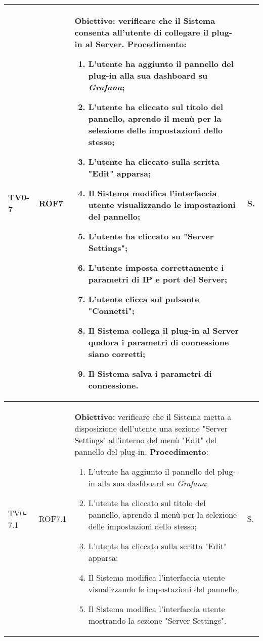 \begin{longtable}{|C{.15\textwidth}|C{.13\textwidth}|m{.65\textwidth}|C{.08\textwidth}|}
TV0-7 & ROF7 &
	\textbf{Obiettivo}: verificare che il Sistema consenta all'utente di collegare il plug-in al Server. \newline
	\textbf{Procedimento}:
	\begin{enumerate}
		\item L'utente ha aggiunto il pannello del plug-in alla sua dashboard su \textit{Grafana};
		\item L'utente ha cliccato sul titolo del pannello, aprendo il menù per la selezione delle impostazioni dello stesso;
		\item L'utente ha cliccato sulla scritta "Edit" apparsa;
		\item Il Sistema modifica l'interfaccia utente visualizzando le impostazioni del pannello;
		\item L'utente ha cliccato su "Server Settings";
		\item L'utente imposta correttamente i parametri di IP e port del Server;
		\item L'utente clicca sul pulsante "Connetti";
		\item Il Sistema collega il plug-in al Server qualora i parametri di connessione siano corretti;
		\item Il Sistema salva i parametri di connessione.
	\end{enumerate}
	& S. \\
\hline

TV0-7.1 & ROF7.1 &
	\textbf{Obiettivo}: verificare che il Sistema metta a disposizione dell'utente una sezione "Server Settings" all'interno del menù "Edit" del pannello del plug-in. \newline
	\textbf{Procedimento}:
	\begin{enumerate}
		\item L'utente ha aggiunto il pannello del plug-in alla sua dashboard su \textit{Grafana};
		\item L'utente ha cliccato sul titolo del pannello, aprendo il menù per la selezione delle impostazioni dello stesso;
		\item L'utente ha cliccato sulla scritta "Edit" apparsa;
		\item Il Sistema modifica l'interfaccia utente visualizzando le impostazioni del pannello;
		\item Il Sistema modifica l'interfaccia utente mostrando la sezione "Server Settings".
	\end{enumerate}
	& S. \\
\hline


\end{longtable}
